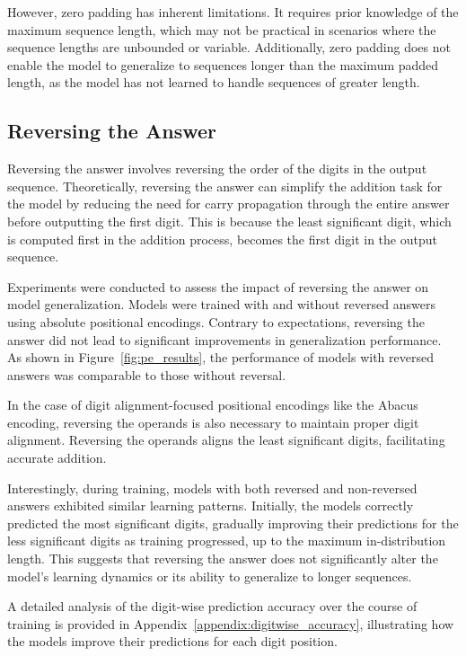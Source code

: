However, zero padding has inherent limitations. It requires prior knowledge of the maximum sequence length, which may not be practical in scenarios where the sequence lengths are unbounded or variable. Additionally, zero padding does not enable the model to generalize to sequences longer than the maximum padded length, as the model has not learned to handle sequences of greater length.


\subsection{Reversing the Answer}

Reversing the answer involves reversing the order of the digits in the output sequence. Theoretically, reversing the answer can simplify the addition task for the model by reducing the need for carry propagation through the entire answer before outputting the first digit. This is because the least significant digit, which is computed first in the addition process, becomes the first digit in the output sequence.

Experiments were conducted to assess the impact of reversing the answer on model generalization. Models were trained with and without reversed answers using absolute positional encodings. Contrary to expectations, reversing the answer did not lead to significant improvements in generalization performance. As shown in Figure~\ref{fig:pe_results}, the performance of models with reversed answers was comparable to those without reversal.

In the case of digit alignment-focused positional encodings like the Abacus encoding, reversing the operands is also necessary to maintain proper digit alignment. Reversing the operands aligns the least significant digits, facilitating accurate addition.

Interestingly, during training, models with both reversed and non-reversed answers exhibited similar learning patterns. Initially, the models correctly predicted the most significant digits, gradually improving their predictions for the less significant digits as training progressed, up to the maximum in-distribution length. This suggests that reversing the answer does not significantly alter the model's learning dynamics or its ability to generalize to longer sequences.

A detailed analysis of the digit-wise prediction accuracy over the course of training is provided in Appendix~\ref{appendix:digitwise_accuracy}, illustrating how the models improve their predictions for each digit position.

